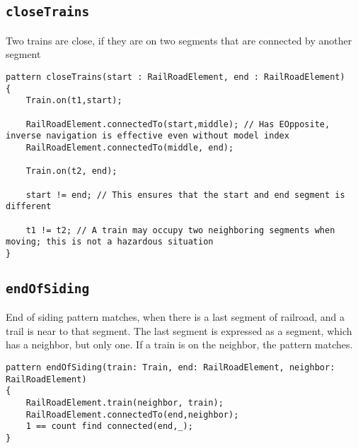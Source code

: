 \subsection{\texttt{closeTrains}}
\begin{minipage}{\textwidth}
Two trains are close, if they are on two segments that are connected by another segment
\begin{lstlisting}[language = vql]
pattern closeTrains(start : RailRoadElement, end : RailRoadElement)
{
	Train.on(t1,start);
	
	RailRoadElement.connectedTo(start,middle); // Has EOpposite, inverse navigation is effective even without model index
	RailRoadElement.connectedTo(middle, end);
	
	Train.on(t2, end);
	
	start != end; // This ensures that the start and end segment is different
	
	t1 != t2; // A train may occupy two neighboring segments when moving; this is not a hazardous situation
}
\end{lstlisting}
\end{minipage}
\vspace{\belowdisplayskip}




\subsection{\texttt{endOfSiding}}

End of siding pattern matches, when there is a last segment of railroad, and a trail is near to that segment.
The last segment is expressed as a segment, which has a neighbor, but only one.
If a train is on the neighbor, the pattern matches.

\begin{minipage}{\textwidth}
\begin{lstlisting}[language = vql]
pattern endOfSiding(train: Train, end: RailRoadElement, neighbor: RailRoadElement)
{
	RailRoadElement.train(neighbor, train);		
	RailRoadElement.connectedTo(end,neighbor);
	1 == count find connected(end,_);	
}


\end{lstlisting}
\end{minipage}
\vspace{\belowdisplayskip}


